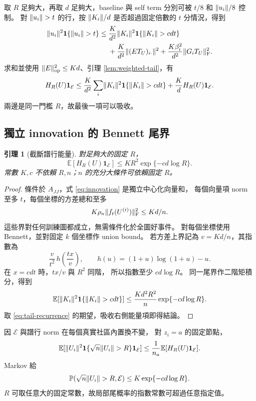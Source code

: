 \documentclass[11pt,a4paper]{article}
\theoremstyle{zhplain}
\newtheorem{lemma}[theorem]{引理}
\numberwithin{equation}{section}
\newcommand{\E}{\mathbb E}
\newcommand{\PP}{\mathbb P}
\newcommand{\one}{\mathbf 1}
\newcommand{\op}{\mathrm{op}}
\newcommand{\Frob}{\mathrm{F}}
\newcommand{\cE}{\mathcal E}
\DeclarePairedDelimiter{\norm}{\lVert}{\rVert}
\begin{document}
取 \(R\) 足夠大，再取 \(d\) 足夠大，baseline 與 self term
分別可被 \(t/8\) 和 \(\norm{u_i}/8\) 控制。
對 \(\norm{u_i}>t\) 的行，按 \(\norm{K_i}/d\) 是否超過固定倍數的 \(t\)
分情況，得到
\begin{align}
 \norm{u_i}^2\one\{\norm{u_i}>t\}\le {}&
 \frac K{d^2}\norm{K_i}^2\one\{\norm{K_i}>cdt\}\notag\\
 &+\frac K{d^2}\norm{(ET_U)_{i\cdot}}^2
 +\frac{K\beta_i^2}{d^2}\norm{G_iT_U}_{\Frob}^2.
 \label{eq:pointwise-tail}
\end{align}
求和並使用 \(\norm E_{\op}^2\le Kd\)、引理 \ref{lem:weighted-tail}，有
\begin{equation}
 H_R(U)\one_{\cE}
 \le \frac K{d^2}\sum_i\norm{K_i}^2\one\{\norm{K_i}>cdt\}
 +\frac Kd H_R(U)\one_{\cE}.
 \label{eq:tail-recurrence}
\end{equation}
兩邊是同一門檻 \(R\)，故最後一項可以吸收。

\subsection{獨立 innovation 的 Bennett 尾界}
\begin{lemma}[截斷譜行能量]
\label{lem:row-energy}
對足夠大的固定 \(R\)，
\begin{equation}
 \E[H_R(U)\one_{\cE}]
 \le KR^2\exp\{-cd\log R\}.
 \label{eq:row-energy}
\end{equation}
常數 \(K,c\) 不依賴 \(R,n\)；\(n\) 的充分大條件可依賴固定 \(R\)。
\end{lemma}
\begin{proof}
條件於 \(A_{JJ}\)，式 \eqref{eq:innovation} 是獨立中心化向量和，
每個向量項 norm 至多 \(t\)，每個坐標的方差總和至多
\[
 K\rho_n\norm{f_t(U^{(i)})}_{\Frob}^2\le Kd/n.
\]
這些界對任何訓練圖都成立，無需條件化於全圖好事件。
對每個坐標使用 Bennett，並對固定 \(k\) 個坐標作 union bound。
若方差上界記為 \(v=Kd/n\)，其指數為
\[
 \frac{v}{t^2}\,
 h\!\left(\frac{tx}{v}\right),
 \qquad h(u)=(1+u)\log(1+u)-u.
\]
在 \(x=cdt\) 時，\(tx/v\) 與 \(R^2\) 同階，
所以指數至少 \(cd\log R\)。
同一尾界作二階矩積分，得到
\[
 \E[\norm{K_i}^2\one\{\norm{K_i}>cdt\}]
 \le \frac{Kd^2R^2}{n}\exp\{-cd\log R\}.
\]
取 \eqref{eq:tail-recurrence} 的期望，吸收右側能量項即得結論。
\end{proof}

因 \(\cE\) 與譜行 norm 在每個真實社區內置換不變，
對 \(z_i=a\) 的固定節點，
\[
 \E[\norm{U_i}^2\one\{\sqrt n\norm{U_i}>R\}\one_{\cE}]
 \le \frac1{n_a}\E[H_R(U)\one_{\cE}].
\]
Markov 給
\begin{equation}
 \PP(\sqrt n\norm{U_i}>R,\cE)
 \le K\exp\{-cd\log R\}.
 \label{eq:fixed-row-tail}
\end{equation}
\(R\) 可取任意大的固定常數，故局部尾概率的指數常數可超過任意指定值。
\end{document}
